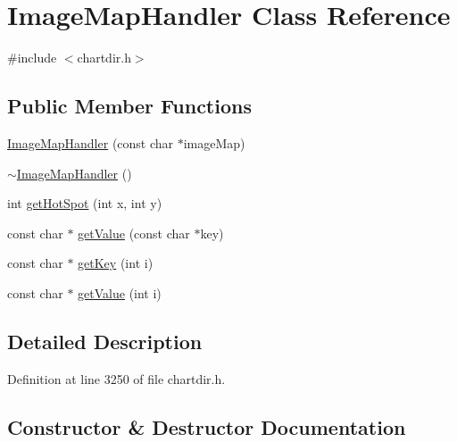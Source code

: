 \hypertarget{class_image_map_handler}{}\section{Image\+Map\+Handler Class Reference}
\label{class_image_map_handler}


{\ttfamily \#include $<$chartdir.\+h$>$}

\subsection*{Public Member Functions}
\begin{DoxyCompactItemize}
\item 
\hyperlink{class_image_map_handler_a19c3a1351b91de751379f46f3b61469d}{Image\+Map\+Handler} (const char $\ast$image\+Map)
\item 
\hyperlink{class_image_map_handler_a19c82d060f11d562f2d352260717bef3}{$\sim$\+Image\+Map\+Handler} ()
\item 
int \hyperlink{class_image_map_handler_a17a681be22adb478e1355a4834fe02e1}{get\+Hot\+Spot} (int x, int y)
\item 
const char $\ast$ \hyperlink{class_image_map_handler_a90e325e0e5a580f816450f717796c452}{get\+Value} (const char $\ast$key)
\item 
const char $\ast$ \hyperlink{class_image_map_handler_a3c7d7c5a513b5e3fe46d11e5df99f3b1}{get\+Key} (int i)
\item 
const char $\ast$ \hyperlink{class_image_map_handler_aea6dfdd08bc4e2fa35bda829e3984389}{get\+Value} (int i)
\end{DoxyCompactItemize}


\subsection{Detailed Description}


Definition at line 3250 of file chartdir.\+h.



\subsection{Constructor \& Destructor Documentation}
\mbox{\label{class_image_map_handler_a19c3a1351b91de751379f46f3b61469d}} 
